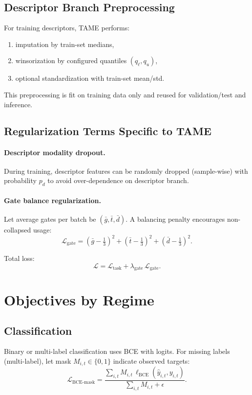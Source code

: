 \documentclass[11pt,a4paper]{article}
\begin{document}
\subsection{Descriptor Branch Preprocessing}
For training descriptors, TAME performs:
\begin{enumerate}[label=\arabic*.]
    \item imputation by train-set medians,
    \item winsorization by configured quantiles $(q_{\ell}, q_u)$,
    \item optional standardization with train-set mean/std.
\end{enumerate}

This preprocessing is fit on training data only and reused for validation/test and inference.

\subsection{Regularization Terms Specific to TAME}
\paragraph{Descriptor modality dropout.}
During training, descriptor features can be randomly dropped (sample-wise) with probability $p_d$ to avoid over-dependence on descriptor branch.

\paragraph{Gate balance regularization.}
Let average gates per batch be $(\bar{g}, \bar{t}, \bar{d})$. A balancing penalty encourages non-collapsed usage:
\begin{equation}
\mathcal{L}_{\text{gate}} = (\bar{g}-\tfrac{1}{3})^2 + (\bar{t}-\tfrac{1}{3})^2 + (\bar{d}-\tfrac{1}{3})^2.
\end{equation}

Total loss:
\begin{equation}
\mathcal{L} = \mathcal{L}_{\text{task}} + \lambda_{\text{gate}}\,\mathcal{L}_{\text{gate}}.
\end{equation}

\section{Objectives by Regime}
\subsection{Classification}
Binary or multi-label classification uses BCE with logits. For missing labels (multi-label), let mask $M_{i,t} \in \{0,1\}$ indicate observed targets:
\begin{equation}
\mathcal{L}_{\text{BCE-mask}} = \frac{\sum_{i,t} M_{i,t}\,\ell_{\text{BCE}}(\hat{y}_{i,t}, y_{i,t})}{\sum_{i,t} M_{i,t} + \epsilon}.
\end{equation}
\end{document}
